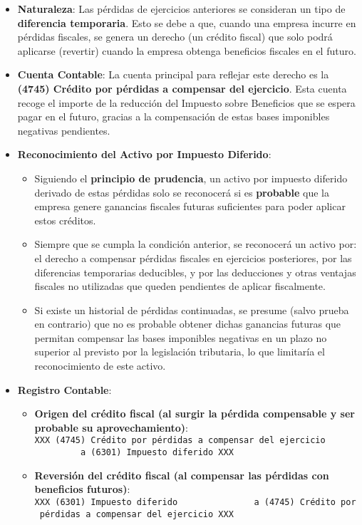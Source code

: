 \documentclass[
  paper=a4,
  ,captions=tableheading
]{scrbook}
\providecommand{\tightlist}{%
  \setlength{\itemsep}{0pt}\setlength{\parskip}{0pt}}
\begin{document}
\begin{itemize}
\tightlist
\item
  \textbf{Naturaleza}: Las pérdidas de ejercicios anteriores se
  consideran un tipo de \textbf{diferencia temporaria}. Esto se debe a
  que, cuando una empresa incurre en pérdidas fiscales, se genera un
  derecho (un crédito fiscal) que solo podrá aplicarse (revertir) cuando
  la empresa obtenga beneficios fiscales en el futuro.
\item
  \textbf{Cuenta Contable}: La cuenta principal para reflejar este
  derecho es la \textbf{(4745) Crédito por pérdidas a compensar del
  ejercicio}. Esta cuenta recoge el importe de la reducción del Impuesto
  sobre Beneficios que se espera pagar en el futuro, gracias a la
  compensación de estas bases imponibles negativas pendientes.
\item
  \textbf{Reconocimiento del Activo por Impuesto Diferido}:

  \begin{itemize}
  \tightlist
  \item
    Siguiendo el \textbf{principio de prudencia}, un activo por impuesto
    diferido derivado de estas pérdidas solo se reconocerá si es
    \textbf{probable} que la empresa genere ganancias fiscales futuras
    suficientes para poder aplicar estos créditos.
  \item
    Siempre que se cumpla la condición anterior, se reconocerá un activo
    por: el derecho a compensar pérdidas fiscales en ejercicios
    posteriores, por las diferencias temporarias deducibles, y por las
    deducciones y otras ventajas fiscales no utilizadas que queden
    pendientes de aplicar fiscalmente.
  \item
    Si existe un historial de pérdidas continuadas, se presume (salvo
    prueba en contrario) que no es probable obtener dichas ganancias
    futuras que permitan compensar las bases imponibles negativas en un
    plazo no superior al previsto por la legislación tributaria, lo que
    limitaría el reconocimiento de este activo.
  \end{itemize}
\item
  \textbf{Registro Contable}:

  \begin{itemize}
  \tightlist
  \item
    \textbf{Origen del crédito fiscal (al surgir la pérdida compensable
    y ser probable su aprovechamiento)}:
    \texttt{XXX\ (4745)\ Crédito\ por\ pérdidas\ a\ compensar\ del\ ejercicio\ \ \ \ \ \ \ \ \ \ \ \ \ \ \ a\ (6301)\ Impuesto\ diferido\ XXX}
  \item
    \textbf{Reversión del crédito fiscal (al compensar las pérdidas con
    beneficios futuros)}:
    \texttt{XXX\ (6301)\ Impuesto\ diferido\ \ \ \ \ \ \ \ \ \ \ \ \ \ \ a\ (4745)\ Crédito\ por\ pérdidas\ a\ compensar\ del\ ejercicio\ XXX}
  \end{itemize}
\end{itemize}
\end{document}
